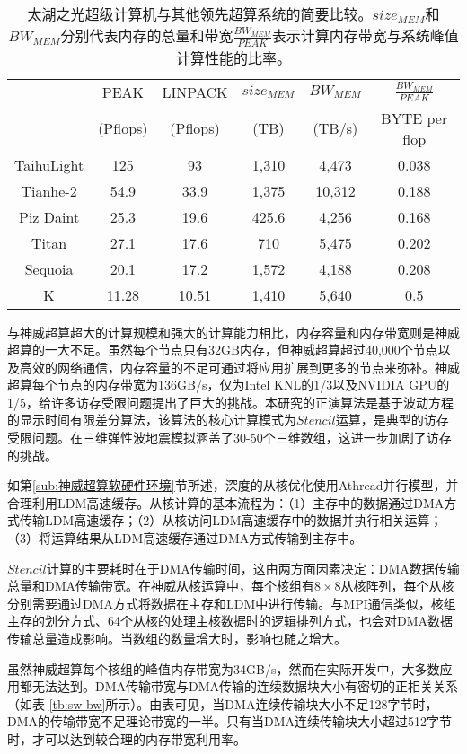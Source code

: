 \begin{table}[ht]
\footnotesize
\caption{太湖之光超级计算机与其他领先超算系统的简要比较。$size_{MEM}$和$BW_{MEM}$分别代表内存的总量和带宽$\frac{BW_{MEM}}{PEAK}$表示计算内存带宽与系统峰值计算性能的比率。}
\label{tb:supercomputer-comp}
\center
\begin{tabular*}{0.8\columnwidth}{cccccc}
\hline\hline
   & PEAK & LINPACK & $size_{MEM}$  & $BW_{MEM}$ & $\frac{BW_{MEM}}{PEAK}$ \\
   & (Pflops) & (Pflops) & (TB) & (TB/s) & {BYTE per flop} \\
   \hline
   TaihuLight & 125 & 93 & 1,310 & 4,473 & 0.038 \\\hline
   Tianhe-2 & 54.9 & 33.9 & 1,375 & 10,312 & 0.188 \\\hline
   Piz Daint & 25.3 & 19.6 & 425.6 & 4,256 & 0.168 \\\hline
   Titan & 27.1 & 17.6 & 710 & 5,475 & 0.202 \\\hline
   Sequoia & 20.1 & 17.2 & 1,572 & 4,188 & 0.208 \\\hline
   K & 11.28 & 10.51 & 1,410 & 5,640 & 0.5 \\\hline
\hline
\end{tabular*}
\end{table}

与神威超算超大的计算规模和强大的计算能力相比，内存容量和内存带宽则是神威超算的一大不足。虽然每个节点只有32GB内存，但神威超算超过40,000个节点以及高效的网络通信，内存容量的不足可通过将应用扩展到更多的节点来弥补。神威超算每个节点的内存带宽为136GB/s，仅为Intel KNL的1/3以及NVIDIA GPU的1/5，给许多访存受限问题提出了巨大的挑战。本研究的正演算法是基于波动方程的显示时间有限差分算法，该算法的核心计算模式为$Stencil$运算，是典型的访存受限问题。在三维弹性波地震模拟涵盖了30-50个三维数组，这进一步加剧了访存的挑战。

如第\ref{sub:神威超算软硬件环境}节所述，深度的从核优化使用Athread并行模型，并合理利用LDM高速缓存。从核计算的基本流程为：（1）主存中的数据通过DMA方式传输LDM高速缓存；（2）从核访问LDM高速缓存中的数据并执行相关运算；（3）将运算结果从LDM高速缓存通过DMA方式传输到主存中。

$Stencil$计算的主要耗时在于DMA传输时间，这由两方面因素决定：DMA数据传输总量和DMA传输带宽。在神威从核运算中，每个核组有$8\times8$从核阵列，每个从核分别需要通过DMA方式将数据在主存和LDM中进行传输。与MPI通信类似，核组主存的划分方式、64个从核的处理主核数据时的逻辑排列方式，也会对DMA数据传输总量造成影响。当数组的数量增大时，影响也随之增大。


虽然神威超算每个核组的峰值内存带宽为34GB/s，然而在实际开发中，大多数应用都无法达到。DMA传输带宽与DMA传输的连续数据块大小有密切的正相关关系（如表
\ref{tb:sw-bw}所示）。由表可见，当DMA连续传输块大小不足128字节时，DMA的传输带宽不足理论带宽的一半。只有当DMA连续传输块大小超过512字节时，才可以达到较合理的内存带宽利用率。

